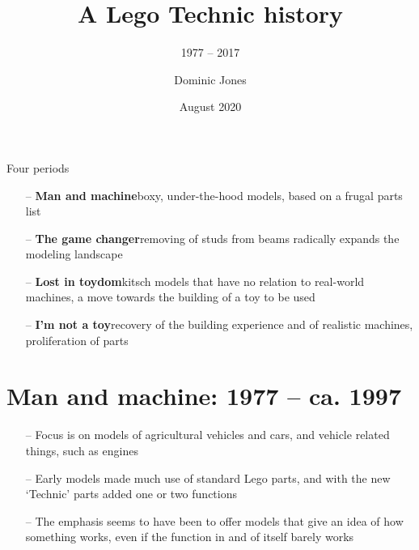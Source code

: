 \documentclass[xcolor=dvipsnames]{beamer}
\title{A Lego Technic history}
\subtitle{1977 -- 2017}
\author{Dominic Jones}
\date{August 2020}
\begin{document}
\begin{frame}[plain]
  \titlepage
\end{frame}


\begin{frame}[fragile]{Four periods}
\begin{itemize}
\item[--] \textbf{Man and machine}\newline boxy, under-the-hood models, based on a frugal parts list \vspace{3mm}
\item[--] \textbf{The game changer}\newline  removing of studs from beams radically expands the modeling landscape \vspace{3mm}
\item[--] \textbf{Lost in toydom}\newline  kitsch models that have no relation to real-world machines, a move towards the building of a toy to be used \vspace{3mm}
\item[--] \textbf{I'm not a toy}\newline  recovery of the building experience and of realistic machines, proliferation of parts \vspace{3mm}
\end{itemize}
\end{frame}


\section{Man and machine: 1977 -- ca. 1997}

\begin{frame}[fragile]{}
\begin{itemize}
\item[--] Focus is on models of agricultural vehicles and cars, and vehicle related things, such as engines \vspace{3mm}
\item[--] Early models made much use of standard Lego parts, and with the new `Technic' parts added one or two functions \vspace{3mm}
\item[--] The emphasis seems to have been to offer models that give an idea of how something works, even if the function in and of itself barely works \vspace{3mm}
\end{itemize}
\end{frame}
\end{document}
